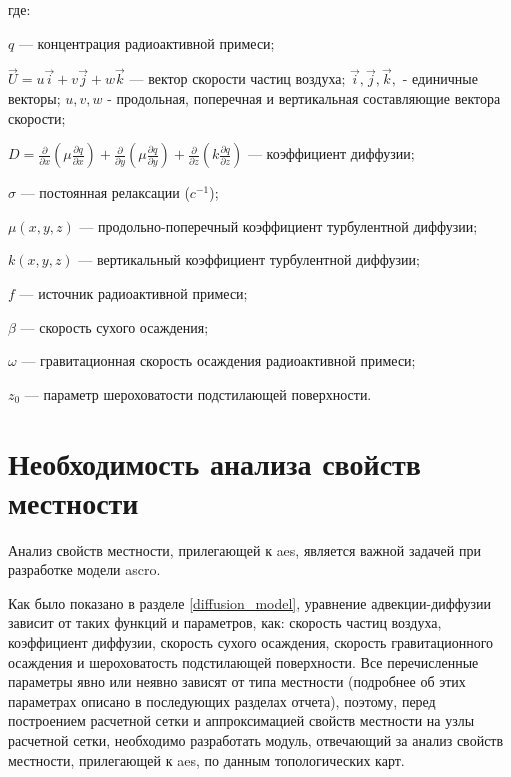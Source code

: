 где:
\begin{description}
    \item $q$ --- концентрация радиоактивной примеси;
    \item $\vec{U}=u\vec{i} + v\vec{j} + w\vec{k}$ --- вектор скорости частиц воздуха; $\vec{i}, \vec{j}, \vec{k},$ 
    	- единичные векторы; $u, v, w$ - продольная, поперечная и вертикальная составляющие вектора скорости; 
    \item $D = \frac{\partial}{\partial x}(\mu \frac{\partial q}{\partial x}) 
    	+ \frac{\partial}{\partial y}(\mu \frac{\partial q}{\partial y})
    	+ \frac{\partial}{\partial z}(k \frac{\partial q}{\partial z})$ --- коэффициент диффузии; 
    \item $\sigma$ --- постоянная релаксации ($c^{-1}$);
    \item $\mu(x,y,z)$ --- продольно-поперечный коэффициент турбулентной диффузии;
    \item $k(x,y,z)$ --- вертикальный коэффициент турбулентной диффузии;
    \item $f$ --- источник радиоактивной примеси;
    \item $\beta$ --- скорость сухого осаждения;
    \item $\omega$ --- гравитационная скорость осаждения радиоактивной примеси;
    \item $z_{0}$ --- параметр шероховатости подстилающей поверхности.
\end{description}

\section{Необходимость анализа свойств местности}

Анализ свойств местности, прилегающей к \ac{aes}, является важной задачей при разработке модели \ac{ascro}. 

Как было показано в разделе \ref{diffusion_model}, уравнение адвекции-диффузии зависит от таких функций и параметров, 
как: скорость частиц воздуха, коэффициент диффузии, скорость сухого осаждения, скорость гравитационного осаждения и 
шероховатость подстилающей поверхности. Все перечисленные параметры явно или неявно зависят от типа местности (подробнее 
об этих параметрах описано в последующих разделах отчета), поэтому, перед построением расчетной сетки и аппроксимацией 
свойств местности на узлы расчетной сетки, необходимо разработать модуль, отвечающий за анализ свойств местности, 
прилегающей к \ac{aes}, по данным топологических карт.

